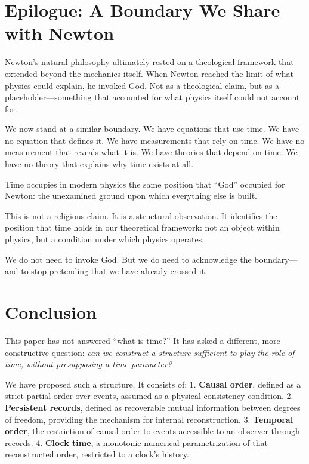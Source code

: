 \documentclass[12pt, a4paper]{article}
\begin{document}
\section{Epilogue: A Boundary We Share with Newton}

Newton's natural philosophy ultimately rested on a theological framework that extended beyond the mechanics itself. When Newton reached the limit of what physics could explain, he invoked God. Not as a theological claim, but as a placeholder---something that accounted for what physics itself could not account for.

We now stand at a similar boundary. We have equations that use time. We have no equation that defines it. We have measurements that rely on time. We have no measurement that reveals what it is. We have theories that depend on time. We have no theory that explains why time exists at all.

Time occupies in modern physics the same position that ``God'' occupied for Newton: the unexamined ground upon which everything else is built.

This is not a religious claim. It is a structural observation. It identifies the position that time holds in our theoretical framework: not an object within physics, but a condition under which physics operates.

We do not need to invoke God. But we do need to acknowledge the boundary---and to stop pretending that we have already crossed it.

\section{Conclusion}

This paper has not answered ``what is time?'' It has asked a different, more constructive question: \textit{can we construct a structure sufficient to play the role of time, without presupposing a time parameter?}

We have proposed such a structure. It consists of:
1. \textbf{Causal order}, defined as a strict partial order over events, assumed as a physical consistency condition.
2. \textbf{Persistent records}, defined as recoverable mutual information between degrees of freedom, providing the mechanism for internal reconstruction.
3. \textbf{Temporal order}, the restriction of causal order to events accessible to an observer through records.
4. \textbf{Clock time}, a monotonic numerical parametrization of that reconstructed order, restricted to a clock's history.
\end{document}
